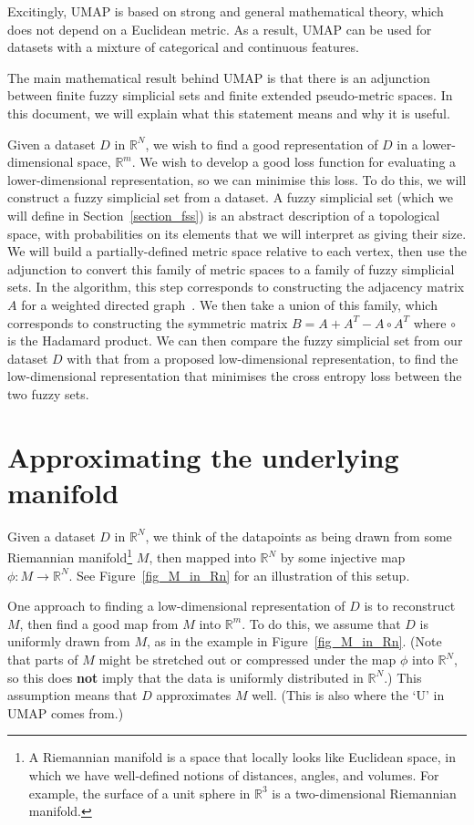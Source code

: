\documentclass[a4paper,12pt,leqno]{article} \usepackage{amsmath}
\newcommand{\RR}{\mathbb{R}} \newcommand{\QQ}{\mathbb{Q}}
\theoremstyle{definition}
\begin{document}
Excitingly, UMAP is based on strong and general mathematical theory, which does
not depend on a Euclidean metric.
As a result, UMAP can be used for datasets with a mixture of categorical and
continuous features.

The main mathematical result behind UMAP is that there is an adjunction between
finite fuzzy simplicial sets and finite extended pseudo-metric spaces.
In this document, we will explain what this statement means and why it is
useful.

Given a dataset $D$ in $\RR^N$, we wish to find a good representation of $D$ in
a lower-dimensional space, $\RR^m$.
We wish to develop a good loss function for evaluating a lower-dimensional
representation, so we can minimise this loss.
To do this, we will construct a fuzzy simplicial set from a dataset.
A fuzzy simplicial set (which we will define in Section~\ref{section_fss}) is
an abstract description of a topological space, with probabilities on its
elements that we will interpret as giving their size.
We will build a partially-defined metric space relative to each vertex, then
use the adjunction to convert this family of metric spaces to a family of fuzzy
simplicial sets.
In the algorithm, this step corresponds to constructing the adjacency matrix
$A$ for a weighted directed graph~\cite[Section 3.1]{McInnes18}.
We then take a union of this family, which corresponds to constructing the
symmetric matrix $B = A+A^T-A\circ A^T$ where $\circ$ is the Hadamard product.
We can then compare the fuzzy simplicial set from our dataset $D$ with that
from a proposed low-dimensional representation, to find the low-dimensional
representation that minimises the cross entropy loss between the two fuzzy
sets.

\section{Approximating the underlying manifold}
\label{section_uniform}

Given a dataset $D$ in $\RR^N$, we think of the datapoints as being drawn from
some Riemannian manifold\footnote{
  A Riemannian manifold is a space that locally looks like Euclidean space, in
  which we have well-defined notions of distances, angles, and volumes.
  For example, the surface of a unit sphere in $\RR^3$ is a two-dimensional
  Riemannian manifold.
} $M$, then mapped into $\RR^N$ by some injective map $\phi: M\to\RR^N$.
See Figure~\ref{fig_M_in_Rn} for an illustration of this setup.

One approach to finding a low-dimensional representation of $D$ is to
reconstruct $M$, then find a good map from $M$ into $\RR^m$.
To do this, we assume that $D$ is uniformly drawn from $M$, as in
the example in Figure~\ref{fig_M_in_Rn}.
(Note that parts of $M$ might be stretched out or compressed under the map
$\phi$ into $\RR^N$, so this does {\textbf{not}} imply that the data is
uniformly distributed in $\RR^N$.)
This assumption means that $D$ approximates $M$ well.
(This is also where the `U' in UMAP comes from.)
\end{document}
